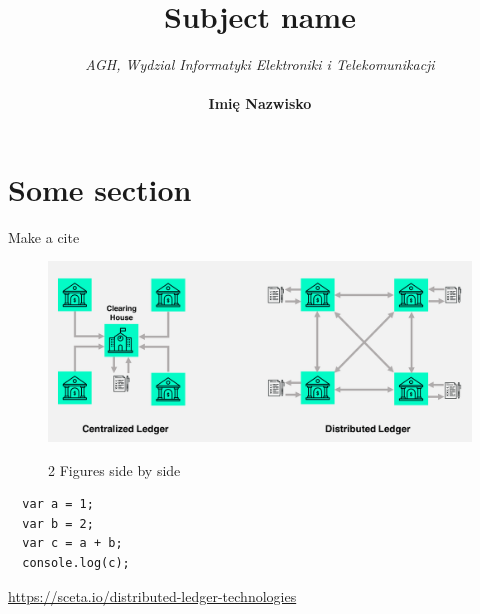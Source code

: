 \documentclass[12pt]{article}
\newenvironment{centerfig}
{\begin{figure}[H]\centering}
{\end{figure}}
\begin{document}
\title{Subject name}
\author{
  \textit{AGH, Wydzial Informatyki Elektroniki i Telekomunikacji} \\ \\
  \textbf{Imię Nazwisko}\\
}
\date{ }
\maketitle
\tableofcontents

\newpage

\section{Some section}
Make a cite \cite{sceta}


\begin{centerfig}
  \includegraphics[width=\textwidth]{1.png}
\end{centerfig}

\begin{centerfig}
  \qquad
  \caption{2 Figures side by side}%
  \label{fig:example}
\end{centerfig}

\begin{lstlisting}
  var a = 1;
  var b = 2;
  var c = a + b;
  console.log(c);
\end{lstlisting}

\begin{thebibliography}{9}
  \url{https://sceta.io/distributed-ledger-technologies}
 
\end{thebibliography}
\end{document}
